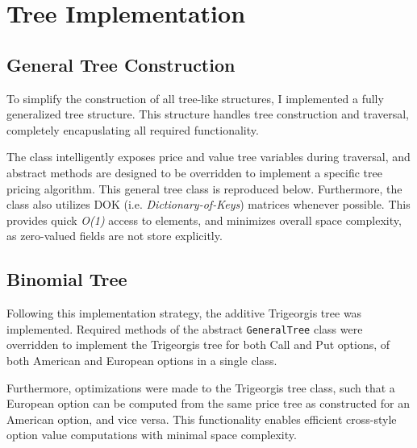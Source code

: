 \documentclass[10pt]{article}
\begin{document}
\newpage

\tableofcontents


\newpage


\section{Tree Implementation}

    \subsection{General Tree Construction} \label{section:gen_tree}

    To simplify the construction of all tree-like structures, I implemented a fully generalized tree structure. This structure handles tree construction and traversal, completely encapuslating all required functionality.

    The class intelligently exposes price and value tree variables during traversal, and abstract methods are designed to be overridden to implement a specific tree pricing algorithm. This general tree class is reproduced below. Furthermore, the class also utilizes DOK (i.e. \textit{Dictionary-of-Keys}) matrices whenever possible. This provides quick \textit{O(1)} access to elements, and minimizes overall space complexity, as zero-valued fields are not store explicitly.

        
    

    \newpage
    \subsection{Binomial Tree}

    Following this implementation strategy, the additive Trigeorgis\cite{Trigeorgis1991} tree was implemented. Required methods of the abstract \texttt{GeneralTree} class were overridden to implement the Trigeorgis tree for both Call and Put options, of both American and European options in a single class.

    Furthermore, optimizations were made to the Trigeorgis tree class, such that a European option can be computed from the same price tree as constructed for an American option, and vice versa. This functionality enables efficient cross-style option value computations with minimal space complexity.
\end{document}
